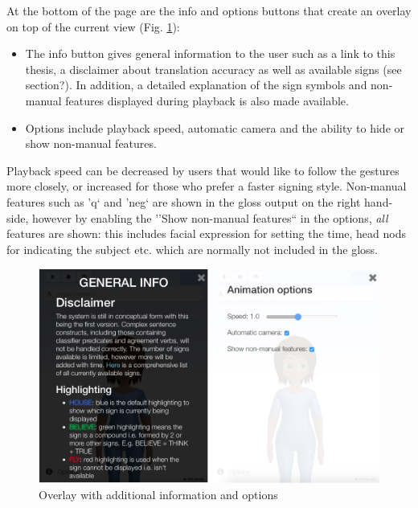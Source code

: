 \documentclass[12pt]{ociamthesis}  %
\begin{document}
At the bottom of the page are the info and options buttons that create an overlay on top of the current view (Fig. \ref{fig:info-option}):
\begin{itemize}
	\item The info button gives general information to the user such as a link to this thesis, a disclaimer about translation accuracy as well as available signs (see section?). In addition, a detailed explanation of the sign symbols and non-manual features displayed during playback is also made available.
	\item Options include playback speed, automatic camera and the ability to hide or show non-manual features. 
\end{itemize}
Playback speed can be decreased by users that would like to follow the gestures more closely, or increased for those who prefer a faster signing style. Non-manual features such as 'q` and 'neg` are shown in the gloss output on the right hand-side, however by enabling the ''Show non-manual features`` in the options, \textit{all} features are shown: this includes facial expression for setting the time, head nods for indicating the subject etc. which are normally not included in the gloss.
\begin{figure}[h]
	\centering
    \includegraphics[scale=0.33]{chapter3/info-option}
    \caption{Overlay with additional information and options}
    \label{fig:info-option}
\end{figure}
\end{document}
